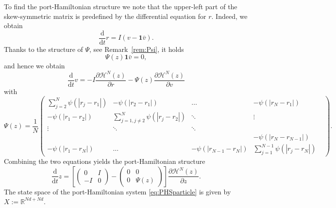 \documentclass[11pt]{article}
\newcommand{\R}[0]{\mathbb R}
\newcommand{\calH}[0]{\mathcal H}
\newcommand{\dd}[0]{\mathrm d}
\begin{document}
\begin{bibunit}[abbrv]
To find the port-Hamiltonian structure we note that the upper-left part of the skew-symmetric matrix is predefined by the differential equation for $r$. Indeed, we obtain
\[
\frac{\dd}{\dd t} r = I (v-\textbf{1}\bar v).
\]
Thanks to the structure of $\Psi$, see Remark~\ref{rem:Psi}, it holds
\begin{equation}\label{eqn:null}
\Psi(z)\textbf{1}\bar v = 0, 
\end{equation}
and hence we obtain
\[ 
\frac{\dd}{\dd t} v = -I\frac{\partial \calH^N(z)}{\partial r} -\Psi(z)\frac{\partial \calH^N(z)}{\partial v}
\]
with
\[  \Psi(z) =\frac{1}{N}\begin{pmatrix} \displaystyle\sum_{j=2}^N \!\psi(|r_j-r_1|) &-\psi(|r_2-r_1|) & \ldots & -\psi(|r_N-r_1|)\\
-\psi(|r_1-r_2|) & \displaystyle\sum_{j=1,j\ne 2}^N \!\psi(|r_j-r_2|)& \ddots & \vdots\\
\vdots &\ddots &\ddots&&\\
&&&-\psi(|r_N\!-\!r_{N-1}|)\\
-\psi(|r_1-r_N|)&\ldots&-\psi(|r_{N-1}\!-\!r_N|)&\displaystyle\sum_{j=1}^{N-1} \!\psi(|r_j-r_N|)\end{pmatrix}.\]
Combining the two equations yields the port-Hamiltonian structure
\begin{equation}\label{eq:PHSparticle}
\frac{\dd}{\dd t} z = \left[ \begin{pmatrix} 0 & I \\ -I & 0 \end{pmatrix} - \begin{pmatrix} 0 & 0 \\ 0 & \Psi(z) \end{pmatrix} \right] \frac{\partial \calH^N(z)}{\partial z}. 
\end{equation}
The state space of the port-Hamiltonian system \eqref{eq:PHSparticle} is given by $X:=\R^{Nd+Nd}$.


\end{bibunit}
\end{document}
